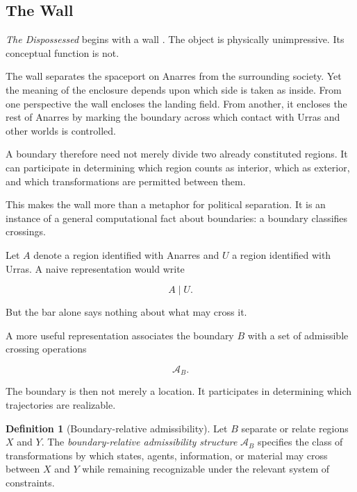 \documentclass[
  11pt,
  a4paper,
  DIV=12,
  BCOR=0mm,
  parskip=half-
]{scrartcl}
\newcommand{\Adm}{\mathcal A}
\theoremstyle{definition}
\newtheorem{definition}{Definition}[section]
\theoremstyle{plain}
\theoremstyle{remark}
\begin{document}

\subsection{The Wall}
\label{sec:wall}

\emph{The Dispossessed} begins with a wall \cite{leguin1974}. The object is
physically unimpressive. Its conceptual function is not.

The wall separates the spaceport on Anarres from the surrounding society. Yet
the meaning of the enclosure depends upon which side is taken as inside. From
one perspective the wall encloses the landing field. From another, it encloses
the rest of Anarres by marking the boundary across which contact with Urras
and other worlds is controlled.

A boundary therefore need not merely divide two already constituted regions.
It can participate in determining which region counts as interior, which as
exterior, and which transformations are permitted between them.

This makes the wall more than a metaphor for political separation. It is an
instance of a general computational fact about boundaries: a boundary
classifies crossings.

Let \(A\) denote a region identified with Anarres and \(U\) a region identified
with Urras. A naive representation would write

\[
  A\mid U.
\]

But the bar alone says nothing about what may cross it.

A more useful representation associates the boundary \(B\) with a set of
admissible crossing operations

\[
  \Adm_B.
\]

The boundary is then not merely a location. It participates in determining
which trajectories are realizable.

\begin{definition}[Boundary-relative admissibility]
\label{def:boundary-admissibility}
Let \(B\) separate or relate regions \(X\) and \(Y\). The
\emph{boundary-relative admissibility structure} \(\Adm_B\) specifies the
class of transformations by which states, agents, information, or material
may cross between \(X\) and \(Y\) while remaining recognizable under the
relevant system of constraints.
\end{definition}
\end{document}
